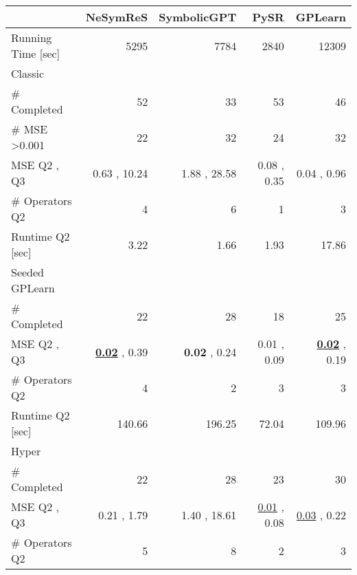 %

\begin{tabularx}{\textwidth}{lRRRR}
\toprule
  &  NeSymReS  &  SymbolicGPT  &  PySR  &  GPLearn  \\
\midrule
Running Time [sec]  &  5295  &  7784  &  2840  &  12309  \\
Classic  &     &     &     &     \\
\qquad  \# Completed  &  52\phantom{.00}  &  33\phantom{.00}  &  53\phantom{.00}  &  46\phantom{.00}  \\
\qquad  \# MSE >0.001  &  22\phantom{.00}  &  32\phantom{.00}  &  24\phantom{.00}  &  32\phantom{.00}  \\
\qquad MSE Q2 ,  Q3  &  0.63  ,  10.24  &  1.88  ,  28.58  &  0.08  ,  0.35  &  0.04  ,  0.96  \\
\qquad \# Operators Q2  &  4\phantom{.00}  &  6\phantom{.00}  &  1\phantom{.00}  &  3\phantom{.00}  \\
\qquad Runtime Q2 [sec]  &  3.22  &  1.66  &  1.93  &  17.86  \\
Seeded GPLearn  &     &     &     &     \\
\qquad  \# Completed  &  22\phantom{.00}  &  28\phantom{.00}  &  18\phantom{.00}  &  25\phantom{.00}  \\
\qquad MSE Q2 ,  Q3  &  \underline{\textbf{0.02}}  ,  0.39  &  \textbf{0.02}  ,  0.24  &  0.01  ,  0.09  &  \underline{\textbf{0.02}}  ,  0.19  \\
\qquad \# Operators Q2  &  4\phantom{.00}  &  2\phantom{.00}  &  3\phantom{.00}  &  3\phantom{.00}  \\
\qquad Runtime Q2 [sec]  &  140.66  &  196.25  &  72.04  &  109.96  \\
Hyper  &     &     &     &     \\
\qquad  \# Completed  &  22\phantom{.00}  &  28\phantom{.00}  &  23\phantom{.00}  &  30\phantom{.00}  \\
\qquad MSE Q2 ,  Q3  &  0.21  ,  1.79  &  1.40  ,  18.61  &  \underline{0.01}  ,  0.08  &  \underline{0.03}  ,  0.22  \\
\qquad \# Operators Q2  &  5\phantom{.00}  &  8\phantom{.00}  &  2\phantom{.00}  &  3\phantom{.00}  \\

\end{tabularx}
